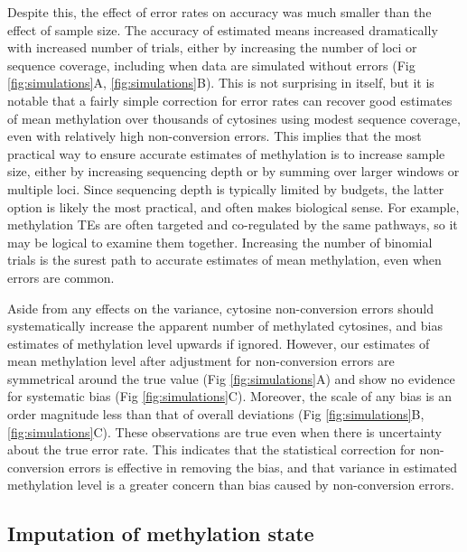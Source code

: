 \documentclass[twocolumn,twoside,lettersize]{article}
\begin{document}
Despite this, the effect of error rates on accuracy was much smaller than the effect of sample size.
The accuracy of estimated means increased dramatically with increased number of trials, either by increasing the number of loci or sequence coverage, including when data are simulated without errors (Fig \ref{fig:simulations}A, \ref{fig:simulations}B).
This is not surprising in itself, but it is notable that a fairly simple correction for error rates can recover good estimates of mean methylation over thousands of cytosines using modest sequence coverage, even with relatively high non-conversion errors.
This implies that the most practical way to ensure accurate estimates of methylation is to increase sample size, either by increasing sequencing depth or by summing over larger windows or multiple loci.
Since sequencing depth is typically limited by budgets, the latter option is likely the most practical, and often makes biological sense.
For example, methylation TEs are often targeted and co-regulated by the same pathways, so it may be logical to examine them together.
Increasing the number of binomial trials is the surest path to accurate estimates of mean methylation, even when errors are common.

Aside from any effects on the variance, cytosine non-conversion errors should systematically increase the apparent number of methylated cytosines, and bias estimates of methylation level upwards if ignored.
However, our estimates of mean methylation level after adjustment for non-conversion errors are symmetrical around the true value (Fig \ref{fig:simulations}A) and show no evidence for systematic bias (Fig \ref{fig:simulations}C).
Moreover, the scale of any bias is an order magnitude less than that of overall deviations (Fig \ref{fig:simulations}B, \ref{fig:simulations}C).
These observations are true even when there is uncertainty about the true error rate.
This indicates that the statistical correction for non-conversion errors is effective in removing the bias, and that variance in estimated methylation level is a greater concern than bias caused by non-conversion errors.

\subsection{Imputation of methylation state}
\end{document}
